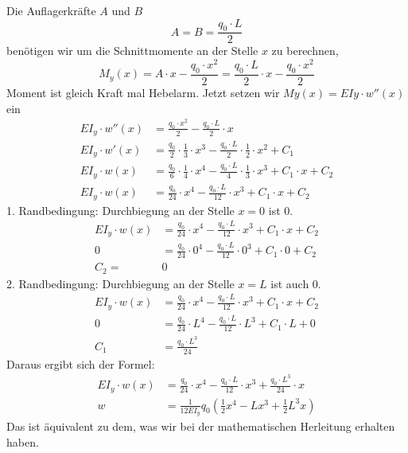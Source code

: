 Die Auflagerkräfte $A$ und $B$
\begin{equation}
	A=
	B=
	\frac{q_0\cdot L}{2}
\end{equation}
benötigen wir um die Schnittmomente an der Stelle $x$ zu berechnen,
\begin{equation}
	M_y(x)=
	A\cdot x-\frac{q_0\cdot x^2}{2}=
	\frac{q_0\cdot L}{2}\cdot x-\frac{q_0\cdot x^2}{2}
\end{equation}
Moment ist gleich Kraft mal Hebelarm.
Jetzt setzen wir $My(x) = EIy \cdot w''(x)$ ein
\begin{align}
		EI_y\cdot w''(x)&=
		\frac{q_0\cdot x^2}{2}-\frac{q_0\cdot L}{2}\cdot x
	\\
		EI_y\cdot w'\left(x\right)&=
		\frac{q_0}{2}\cdot\frac{1}{3}\cdot x^3-\frac{q_0\cdot 	L}{2}\cdot\frac{1}{2}\cdot x^2+C_1
	\\
		EI_y\cdot w\left(x\right)&=
		\frac{q_0}{6}\cdot\frac{1}{4}\cdot x^4-\frac{q_0\cdot 	L}{4}\cdot\frac{1}{3}\cdot x^3+C_1\cdot x+C_2
	\\
		EI_y\cdot w\left(x\right)&=
		\frac{q_0}{24}\cdot x^4-\frac{q_0\cdot L}{12}\cdot x^3+C_1\cdot x+C_2
\end{align}
1. Randbedingung: Durchbiegung an der Stelle $x = 0$ ist 0.
\begin{align}
		EI_y\cdot w\left(x\right)&=
		\frac{q_0}{24}\cdot x^4-\frac{q_0\cdot L}{12}\cdot x^3+C_1\cdot x+C_2
	\\
		0&=
		\frac{q_0}{24}\cdot0^4-\frac{q_0\cdot L}{12}\cdot0^3+C_1\cdot0+C_2
	\\
		C_2=&0
\end{align}
2. Randbedingung: Durchbiegung an der Stelle $x = L$ ist auch 0.
\begin{align}
		EI_y\cdot w\left(x\right)&=
		\frac{q_0}{24}\cdot x^4-\frac{q_0\cdot L}{12}\cdot x^3+C_1\cdot x+C_2
	\\
		0&=
		\frac{q_0}{24}\cdot L^4-\frac{q_0\cdot L}{12}\cdot L^3+C_1\cdot L+0
	\\
		C_1&=
		\frac{q_0\cdot L^3}{24}
\end{align}
Daraus ergibt sich der Formel:
\begin{align}
		EI_y\cdot w\left(x\right)&=
		\frac{q_0}{24}\cdot x^4-\frac{q_0\cdot L}{12}\cdot x^3+\frac{q_0\cdot L^3}{24}\cdot x
	\\
		w&=
		\frac{1}{12EI_y}q_0\left(\frac{1}{2}x^4-Lx^3+\frac{1}{2}L^3x\right)
\end{align}
Das ist äquivalent zu dem, was wir bei der mathematischen Herleitung erhalten haben.

